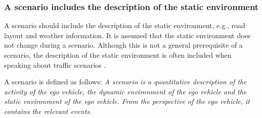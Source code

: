 \subsubsection{A scenario includes the description of the static environment}
A scenario should include the description of the static environment, e.g., road layout and weather information. It is assumed that the static environment does not change during a scenario. Although this is not a general prerequisite of a scenario, the description of the static environment is often included when speaking about traffic scenarios \cite{geyer2014, ulbrich2015, elrofai2016scenario, hulshof2013autonomous, ebner2011identifying, schuldt2013effiziente}.

A scenario is defined as follows: \emph{A scenario is a quantitative description of the activity of the ego vehicle, the dynamic environment of the ego vehicle and the static environment of the ego vehicle. From the perspective of the ego vehicle, it contains the relevant events.}
